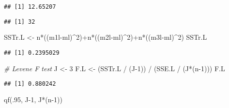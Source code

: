 \documentclass[
]{book}
\newenvironment{Shaded}{\begin{snugshade}}{\end{snugshade}}
\newcommand{\CommentTok}[1]{\textcolor[rgb]{0.56,0.35,0.01}{\textit{#1}}}
\newcommand{\DecValTok}[1]{\textcolor[rgb]{0.00,0.00,0.81}{#1}}
\newcommand{\FunctionTok}[1]{\textcolor[rgb]{0.00,0.00,0.00}{#1}}
\newcommand{\NormalTok}[1]{#1}
\newcommand{\OtherTok}[1]{\textcolor[rgb]{0.56,0.35,0.01}{#1}}
\newcommand{\SpecialCharTok}[1]{\textcolor[rgb]{0.00,0.00,0.00}{#1}}
\begin{document}
\begin{verbatim}
## [1] 12.65207
\end{verbatim}

\begin{Shaded}
\end{Shaded}

\begin{verbatim}
## [1] 32
\end{verbatim}

\begin{Shaded}
\begin{Highlighting}[]
\NormalTok{SSTr.L }\OtherTok{\textless{}{-}}\NormalTok{ n}\SpecialCharTok{*}\NormalTok{((m1l}\SpecialCharTok{{-}}\NormalTok{ml)}\SpecialCharTok{\^{}}\DecValTok{2}\NormalTok{)}\SpecialCharTok{+}\NormalTok{n}\SpecialCharTok{*}\NormalTok{((m2l}\SpecialCharTok{{-}}\NormalTok{ml)}\SpecialCharTok{\^{}}\DecValTok{2}\NormalTok{)}\SpecialCharTok{+}\NormalTok{n}\SpecialCharTok{*}\NormalTok{((m3l}\SpecialCharTok{{-}}\NormalTok{ml)}\SpecialCharTok{\^{}}\DecValTok{2}\NormalTok{)}
\NormalTok{SSTr.L}
\end{Highlighting}
\end{Shaded}

\begin{verbatim}
## [1] 0.2395029
\end{verbatim}

\begin{Shaded}
\begin{Highlighting}[]
\CommentTok{\# Levene F test}
\NormalTok{J }\OtherTok{\textless{}{-}} \DecValTok{3}
\NormalTok{F.L }\OtherTok{\textless{}{-}}\NormalTok{ (SSTr.L }\SpecialCharTok{/}\NormalTok{ (J}\DecValTok{{-}1}\NormalTok{)) }\SpecialCharTok{/}\NormalTok{ (SSE.L }\SpecialCharTok{/}\NormalTok{ (J}\SpecialCharTok{*}\NormalTok{(n}\DecValTok{{-}1}\NormalTok{)))}
\NormalTok{F.L}
\end{Highlighting}
\end{Shaded}

\begin{verbatim}
## [1] 0.880242
\end{verbatim}

\begin{Shaded}
\begin{Highlighting}[]
\FunctionTok{qf}\NormalTok{(.}\DecValTok{95}\NormalTok{, J}\DecValTok{{-}1}\NormalTok{, J}\SpecialCharTok{*}\NormalTok{(n}\DecValTok{{-}1}\NormalTok{))}
\end{Highlighting}
\end{Shaded}
\end{document}

